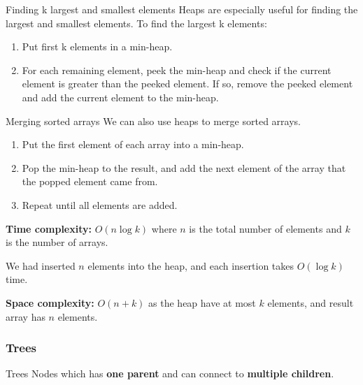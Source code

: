\begin{knBox}
    {Finding k largest and smallest elements}
    Heaps are especially useful for finding the largest and smallest elements. To find the largest k elements:
    \begin{enumerate}
        \item Put first k elements in a min-heap.
        \item For each remaining element, peek the min-heap and check if the current element is greater than the peeked element. If so, remove the peeked element and add the current element to the min-heap.
    \end{enumerate}
\end{knBox}

\begin{knBox}
    {Merging sorted arrays}
    We can also use heaps to merge sorted arrays.
    \begin{enumerate}
        \item Put the first element of each array into a min-heap.
        \item Pop the min-heap to the result, and add the next element of the array that the popped element came from.
        \item Repeat until all elements are added.
    \end{enumerate}
    \textbf{Time complexity:} $O(n \log k)$ where $n$ is the total number of elements and $k$ is the number of arrays.

    We had inserted $n$ elements into the heap, and each insertion takes $O(\log k)$ time.

    \textbf{Space complexity:} $O(n+k)$ as the heap have at most $k$ elements, and result array has $n$ elements.
\end{knBox}

\subsubsection{Trees}

\begin{definition}
    {Trees}
    Nodes which has \textbf{one parent} and can connect to \textbf{multiple children}.
\end{definition}

